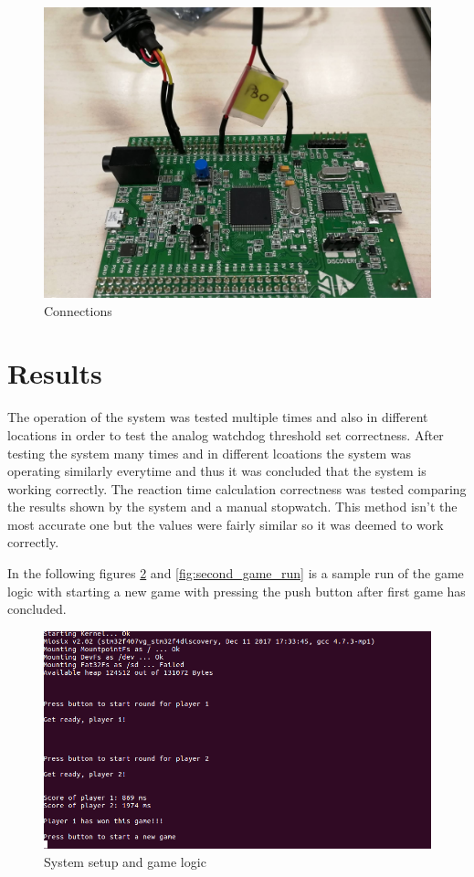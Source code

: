 \begin{figure}[htbp]
  \centering
     \includegraphics[width=1\textwidth]{./figures/connections.jpg}
  \caption{Connections}
  \label{fig:connections}
\end{figure}

\pagebreak

\section{Results} \label{Results}
The operation of the system was tested multiple times and also in different locations in order to test the analog watchdog threshold set correctness. After testing the system many times and in different lcoations the system was operating similarly everytime and thus it was concluded that the system is working correctly. The reaction time calculation correctness was tested comparing the results shown by the system and a manual stopwatch. This method isn't the most accurate one but the values were fairly similar so it was deemed to work correctly.\\
\par In the following figures \ref{fig:first_game_run} and \ref{fig:second_game_run} is a sample run of the game logic with starting a new game with pressing the push button after first game has concluded.

\begin{figure}[htbp]
  \centering
     \includegraphics[width=1\textwidth]{./figures/Game_demo4.png}
  \caption{System setup and game logic}
  \label{fig:first_game_run}
\end{figure}

